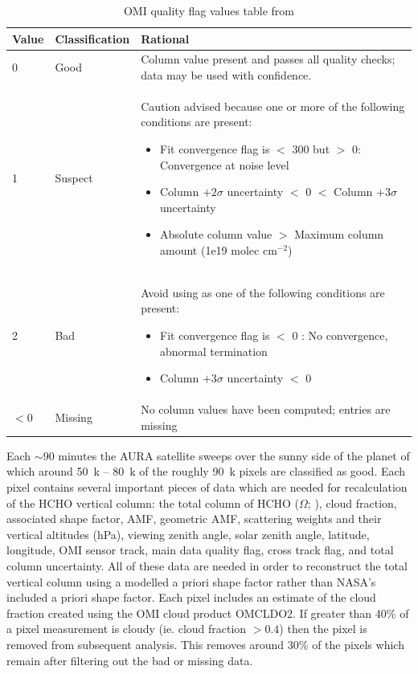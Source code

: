   
  \begin{table}
    \caption{OMI quality flag values table from \textcite{Kurosu2014}}
    \begin{tabular}{  l  l  p{10cm} }
      \hline
      \textbf{Value} & \textbf{Classification} & \textbf{Rational} 
      \\ \hline
      0 & Good & Column value present and passes all quality checks; data may be used with confidence. 
      \\ \hline
      1 & Suspect & Caution advised because one or more of the following conditions are present: 
      \begin{itemize}
        \item Fit convergence flag is $<$ 300 but $>$ 0: Convergence at noise level
        \item Column $+ 2 \sigma$ uncertainty $<$ 0 $<$ Column $ + 3 \sigma $ uncertainty
        \item Absolute column value $>$ Maximum column amount (1e19 molec cm$^{-2}$)
      \end{itemize}
      \\ \hline
      2 & Bad & Avoid using as one of the following conditions are present: 
      \begin{itemize}
        \item Fit convergence flag is $<$ 0 : No convergence, abnormal termination
        \item Column $+ 3 \sigma$ uncertainty $<$ 0
      \end{itemize}
      \\ \hline
      $<0$ & Missing & No column values have been computed; entries are missing
      \\ \hline
    \end{tabular}
    \label{Model:Datasets:OMHCHO:tab_qflag}
  \end{table}
  
  Each $\sim90$ minutes the AURA satellite sweeps over the sunny side of the planet of which around 50~k -- 80~k of the roughly 90~k pixels are classified as good.
  Each pixel contains several important pieces of data which are needed for recalculation of the HCHO vertical column: the total column of HCHO ($\Omega$; \moleccm), cloud fraction, associated shape factor, AMF, geometric AMF, scattering weights and their vertical altitudes (hPa), viewing zenith angle, solar zenith angle, latitude, longitude, OMI sensor track, main data quality flag, cross track flag, and total column uncertainty.
  All of these data are needed in order to reconstruct the total vertical column using a modelled a priori shape factor rather than NASA's included a priori shape factor.
  Each pixel includes an estimate of the cloud fraction created using the OMI cloud product OMCLDO2.
  If greater than 40\% of a pixel measurement is cloudy (ie. cloud fraction $>0.4$) then the pixel is removed from subsequent analysis.
  This removes around 30\% of the pixels which remain after filtering out the bad or missing data.
  
